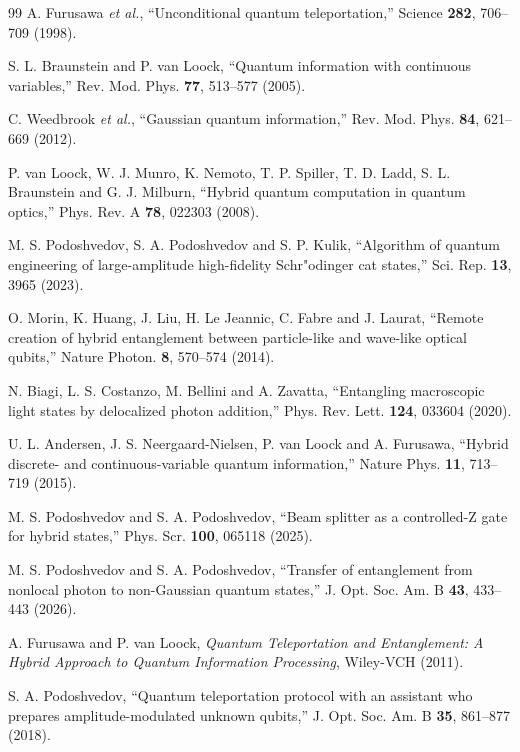 \documentclass{optica-article}
\begin{document}
\begin{thebibliography}{99}
         A. Furusawa {\it et al.}, ``Unconditional quantum teleportation,'' Science {\bf 282}, 706--709 (1998).
        
         S. L. Braunstein and P. van Loock, ``Quantum information with continuous variables,'' Rev. Mod. Phys. {\bf 77}, 513--577 (2005).
        
         C. Weedbrook {\it et al.}, ``Gaussian quantum information,'' Rev. Mod. Phys. {\bf 84}, 621--669 (2012).
        
         P. van Loock, W. J. Munro, K. Nemoto, T. P. Spiller, T. D. Ladd, S. L. Braunstein and G. J. Milburn, ``Hybrid quantum computation in quantum optics,'' Phys. Rev. A {\bf 78}, 022303 (2008).
        
         M. S. Podoshvedov, S. A. Podoshvedov and S. P. Kulik, ``Algorithm of quantum engineering of large-amplitude high-fidelity Schr"odinger cat states,'' Sci. Rep. {\bf 13}, 3965 (2023).
        
         O. Morin, K. Huang, J. Liu, H. Le Jeannic, C. Fabre and J. Laurat, ``Remote creation of hybrid entanglement between particle-like and wave-like optical qubits,'' Nature Photon. {\bf 8}, 570--574 (2014).
        
         N. Biagi, L. S. Costanzo, M. Bellini and A. Zavatta, ``Entangling macroscopic light states by delocalized photon addition,'' Phys. Rev. Lett. {\bf 124}, 033604 (2020).
        
         U. L. Andersen, J. S. Neergaard-Nielsen, P. van Loock and A. Furusawa, ``Hybrid discrete- and continuous-variable quantum information,'' Nature Phys. {\bf 11}, 713--719 (2015).
        
         M. S. Podoshvedov and S. A. Podoshvedov, ``Beam splitter as a controlled-Z gate for hybrid states,'' Phys. Scr. {\bf 100}, 065118 (2025).
        
         M. S. Podoshvedov and S. A. Podoshvedov, ``Transfer of entanglement from nonlocal photon to non-Gaussian quantum states,'' J. Opt. Soc. Am. B {\bf 43}, 433--443 (2026).
        
         A. Furusawa and P. van Loock, {\it Quantum Teleportation and Entanglement: A Hybrid Approach to Quantum Information Processing}, Wiley-VCH (2011).
        
         S. A. Podoshvedov, ``Quantum teleportation protocol with an assistant who prepares amplitude-modulated unknown qubits,'' J. Opt. Soc. Am. B {\bf 35}, 861--877 (2018).
        

\end{thebibliography}
\end{document}
